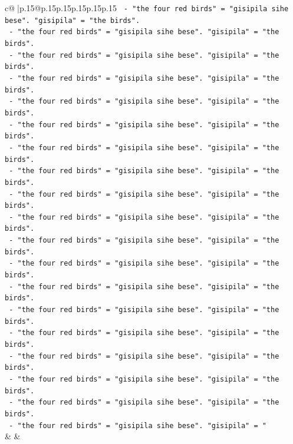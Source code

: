 \documentclass{article}
\begin{document}
{\begin{supertabular}{c@{$\;$}|p{.15\linewidth}@{}p{.15\linewidth}p{.15\linewidth}p{.15\linewidth}p{.15\linewidth}p{.15\linewidth}}
{{{\texttt{  {-} "the four red birds" = "gisipila sihe bese". "gisipila" = "the birds".} \\
\texttt{  {-} "the four red birds" = "gisipila sihe bese". "gisipila" = "the birds".} \\
\texttt{  {-} "the four red birds" = "gisipila sihe bese". "gisipila" = "the birds".} \\
\texttt{  {-} "the four red birds" = "gisipila sihe bese". "gisipila" = "the birds".} \\
\texttt{  {-} "the four red birds" = "gisipila sihe bese". "gisipila" = "the birds".} \\
\texttt{  {-} "the four red birds" = "gisipila sihe bese". "gisipila" = "the birds".} \\
\texttt{  {-} "the four red birds" = "gisipila sihe bese". "gisipila" = "the birds".} \\
\texttt{  {-} "the four red birds" = "gisipila sihe bese". "gisipila" = "the birds".} \\
\texttt{  {-} "the four red birds" = "gisipila sihe bese". "gisipila" = "the birds".} \\
\texttt{  {-} "the four red birds" = "gisipila sihe bese". "gisipila" = "the birds".} \\
\texttt{  {-} "the four red birds" = "gisipila sihe bese". "gisipila" = "the birds".} \\
\texttt{  {-} "the four red birds" = "gisipila sihe bese". "gisipila" = "the birds".} \\
\texttt{  {-} "the four red birds" = "gisipila sihe bese". "gisipila" = "the birds".} \\
\texttt{  {-} "the four red birds" = "gisipila sihe bese". "gisipila" = "the birds".} \\
\texttt{  {-} "the four red birds" = "gisipila sihe bese". "gisipila" = "the birds".} \\
\texttt{  {-} "the four red birds" = "gisipila sihe bese". "gisipila" = "the birds".} \\
\texttt{  {-} "the four red birds" = "gisipila sihe bese". "gisipila" = "the birds".} \\
\texttt{  {-} "the four red birds" = "gisipila sihe bese". "gisipila" = "the birds".} \\
\texttt{  {-} "the four red birds" = "gisipila sihe bese". "gisipila" = "} \\
            }
        }
    }
    & & \\ \\


\end{supertabular}}
\end{document}
